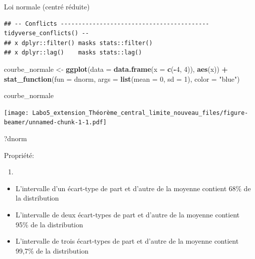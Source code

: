 \documentclass[ignorenonframetext,]{beamer}
\newenvironment{Shaded}{\begin{snugshade}}{\end{snugshade}}
\newcommand{\KeywordTok}[1]{\textcolor[rgb]{0.13,0.29,0.53}{\textbf{#1}}}
\newcommand{\DataTypeTok}[1]{\textcolor[rgb]{0.13,0.29,0.53}{#1}}
\newcommand{\DecValTok}[1]{\textcolor[rgb]{0.00,0.00,0.81}{#1}}
\newcommand{\StringTok}[1]{\textcolor[rgb]{0.31,0.60,0.02}{#1}}
\newcommand{\OperatorTok}[1]{\textcolor[rgb]{0.81,0.36,0.00}{\textbf{#1}}}
\newcommand{\NormalTok}[1]{#1}
\providecommand{\tightlist}{%
  \setlength{\itemsep}{0pt}\setlength{\parskip}{0pt}}
\begin{document}
\begin{frame}[fragile]{Loi normale (centré réduite)}
\begin{verbatim}
## -- Conflicts ------------------------------------------ tidyverse_conflicts() --
## x dplyr::filter() masks stats::filter()
## x dplyr::lag()    masks stats::lag()
\end{verbatim}

\begin{Shaded}
\begin{Highlighting}[]
\NormalTok{courbe_normale <-}\StringTok{ }
\StringTok{  }\KeywordTok{ggplot}\NormalTok{(}\DataTypeTok{data =} \KeywordTok{data.frame}\NormalTok{(}\DataTypeTok{x =} \KeywordTok{c}\NormalTok{(}\OperatorTok{-}\DecValTok{4}\NormalTok{, }\DecValTok{4}\NormalTok{)), }\KeywordTok{aes}\NormalTok{(x)) }\OperatorTok{+}
\StringTok{  }\KeywordTok{stat_function}\NormalTok{(}\DataTypeTok{fun =}\NormalTok{ dnorm, }\DataTypeTok{args =} \KeywordTok{list}\NormalTok{(}\DataTypeTok{mean =} \DecValTok{0}\NormalTok{, }\DataTypeTok{sd =} \DecValTok{1}\NormalTok{), }\DataTypeTok{color =} \StringTok{"blue"}\NormalTok{) }

\NormalTok{courbe_normale}
\end{Highlighting}
\end{Shaded}

\texttt{[image: Labo5\_extension\_Théorème\_central\_limite\_nouveau\_files/figure-beamer/unnamed-chunk-1-1.pdf]}

\begin{Shaded}
\begin{Highlighting}[]
\NormalTok{?dnorm}
\end{Highlighting}
\end{Shaded}

Propriété:

\begin{enumerate}
\def\labelenumi{\arabic{enumi}.}
\item
\end{enumerate}

\begin{itemize}
\tightlist
\item
  L'intervalle d'un écart-type de part et d'autre de la moyenne contient
  68\% de la distribution
\item
  L'intervalle de deux écart-types de part et d'autre de la moyenne
  contient 95\% de la distribution
\item
  L'intervalle de trois écart-types de part et d'autre de la moyenne
  contient 99,7\% de la distribution
\end{itemize}


\end{frame}
\end{document}
